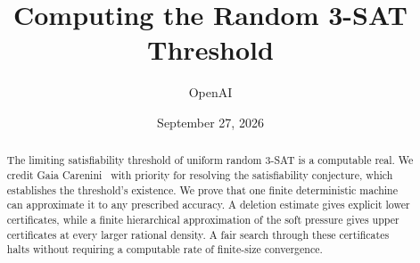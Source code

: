 \documentclass[11pt]{article}
\title{Computing the Random 3-SAT Threshold}
\author{OpenAI}
\date{September 27, 2026}
\newcommand{\1}{\mathbf 1}
\theoremstyle{definition}
\theoremstyle{remark}
\numberwithin{equation}{section}
\begin{document}
\maketitle
\begin{abstract}
The limiting satisfiability threshold of uniform random 3-SAT is a
computable real. We credit Gaia Carenini~\cite{Carenini2026Polynomial}
with priority for resolving the satisfiability conjecture, which
establishes the threshold's existence. We prove that one finite
deterministic machine can approximate it to any prescribed accuracy. A deletion estimate gives
explicit lower certificates, while a finite hierarchical approximation
of the soft pressure gives upper certificates at every larger rational
density. A fair search through these certificates halts without
requiring a computable rate of finite-size convergence.
\end{abstract}



\clearpage
\tableofcontents








\end{document}
